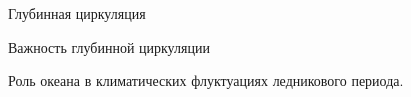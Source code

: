 \begin{chapter}{Глубинная циркуляция}
\begin{section}{Важность глубинной циркуляции}
\begin{paragraph}{Роль океана в климатических флуктуациях ледникового периода.}
\begin{enumerate}


\end{enumerate}
\end{paragraph}
\end{section}
\end{chapter}
